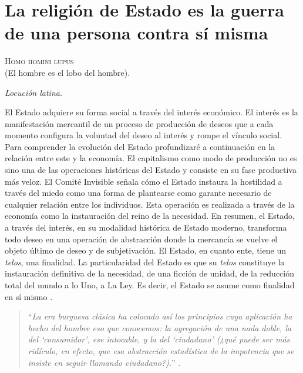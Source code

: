 \section{La religión de Estado es la guerra de una persona contra sí misma}
\label{sec:la-religión-de-estado-es}

\epigraph{\textsc{Homo homini lupus}\\ (\textsf{El hombre es el lobo del hombre}).}{\emph{Locución latina}.}

El Estado adquiere su forma social a través del interés económico. El interés es la manifestación mercantil de un proceso de producción de deseos que a cada momento configura la voluntad del deseo al interés y rompe el vínculo social. Para comprender la evolución del Estado profundizaré a continuación en la relación entre este y la economía. El capitalismo como modo de producción no es sino una de las operaciones históricas del Estado y consiste en su fase productiva más veloz. El Comité Invisible señala cómo el Estado instaura la hostilidad a través del miedo como una forma de plantearse como garante necesario de cualquier relación entre los individuos. Esta operación es realizada a través de la economía como la instauración del reino de la necesidad. En resumen, el Estado, a través del interés, en su modalidad histórica de Estado moderno, transforma todo deseo en una operación de abstracción donde la mercancía se vuelve el objeto último de deseo y de subjetivación. El Estado, en cuanto ente, tiene un \emph{telos}, una finalidad. La particularidad del Estado es que su \emph{telos} constituye la instauración definitiva de la necesidad, de una ficción de unidad, de la reducción total del mundo a lo Uno, a La Ley. Es decir, el Estado se asume como finalidad en sí mismo \autocite{tiqqunIntroduccionGuerraCivil2008}.

\begin{quote}
  \enquote{\emph{La era burguesa clásica ha colocado así los principios cuya aplicación ha hecho del hombre eso que conocemos: la agregación de una nada doble, la del \enquote{consumidor}, ese intocable, y la del \enquote{ciudadano} (¿qué puede ser más ridículo, en efecto, que esa abstracción estadística de la impotencia que se insiste en seguir llamando ciudadano?).}} \autocite{comiteinvisibleTeoriaBloom}.
\end{quote}

